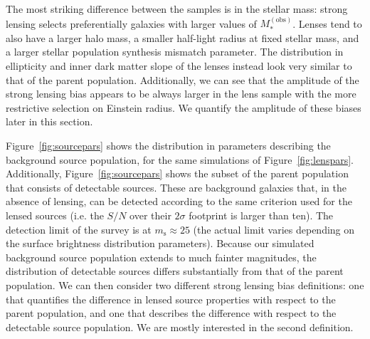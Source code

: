\documentclass{aa}
\def\msource{m_{\mathrm{s}}}
\def\mobs{M_*^{(\mathrm{obs})}}
\def\Sref#1{Section~\ref{#1}\xspace}
\def\Fref#1{Figure~\ref{#1}\xspace}
\begin{document}
The most striking difference between the samples is in the stellar mass: strong lensing selects preferentially galaxies with larger values of $\mobs$.
Lenses tend to also have a larger halo mass, a smaller half-light radius at fixed stellar mass, and a larger stellar population synthesis mismatch parameter. The distribution in ellipticity and inner dark matter slope of the lenses instead look very similar to that of the parent population.
Additionally, we can see that the amplitude of the strong lensing bias appears to be always larger in the lens sample with the more restrictive selection on Einstein radius.
We quantify the amplitude of these biases later in this section.

\Fref{fig:sourcepars} shows the distribution in parameters describing the background source population, for the same simulations of \Fref{fig:lenspars}. 
Additionally, \Fref{fig:sourcepars} shows the subset of the parent population that consists of detectable sources.
These are background galaxies that, in the absence of lensing, can be detected according to the same criterion used for the lensed sources (i.e. the $S/N$ over their $2\sigma$ footprint is larger than ten).
The detection limit of the survey is at $\msource\approx25$ (the actual limit varies depending on the surface brightness distribution parameters).
Because our simulated background source population extends to much fainter magnitudes, the distribution of detectable sources differs substantially from that of the parent population.
We can then consider two different strong lensing bias definitions: one that quantifies the difference in lensed source properties with respect to the parent population, and one that describes the difference with respect to the detectable source population. We are mostly interested in the second definition.
\end{document}
